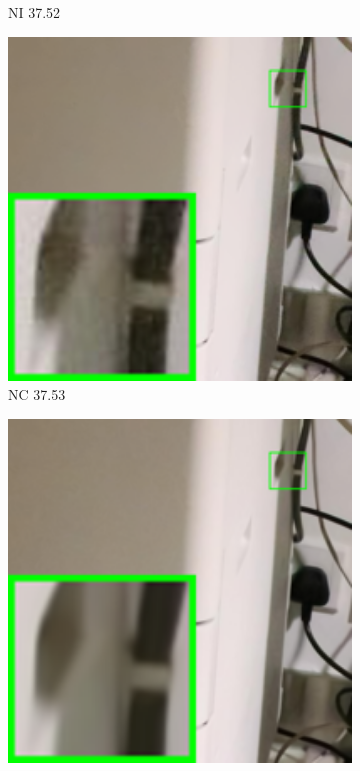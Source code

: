 \begin{figure}
\begin{subfigure}[t]{0.19\textwidth}
		\caption{NI 37.52}
    \end{subfigure}
    \hfill
    \begin{subfigure}[t]{0.19\textwidth}
        \centering
        \includegraphics[width=1\textwidth]{images/guided/resize_br_NC_Canon_80D_ISO12800_IMG_2321_part2.png}
\caption{NC 37.53}
    \end{subfigure}
    \hfill   
    \begin{subfigure}[t]{0.19\textwidth}
        \centering
        \includegraphics[width=1\textwidth]{images/guided/resize_br_Guided_Canon_80D_ISO12800_IMG_2321_part2.png}

\end{subfigure}
\end{figure}
